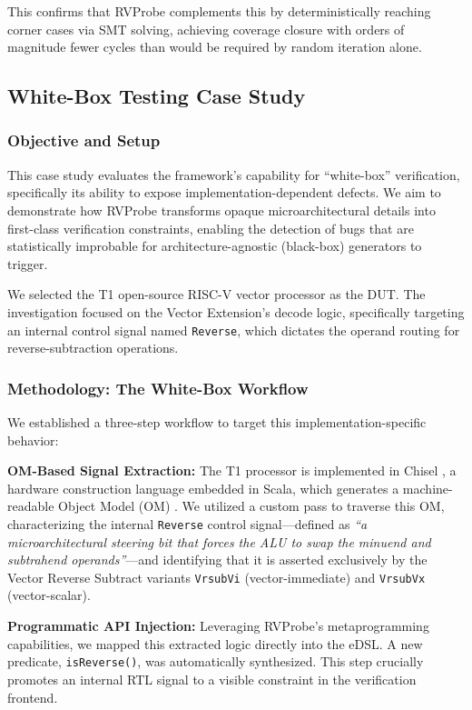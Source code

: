 \documentclass[sigconf]{acmart}
\begin{document}
This confirms that RVProbe complements this by deterministically reaching corner cases via SMT solving, achieving coverage closure with orders of magnitude fewer cycles than would be required by random iteration alone.

\subsection{White-Box Testing Case Study}

\subsubsection{Objective and Setup} This case study evaluates the framework's capability for ``white-box'' verification, specifically its ability to expose implementation-dependent defects. We aim to demonstrate how RVProbe transforms opaque microarchitectural details into first-class verification constraints, enabling the detection of bugs that are statistically improbable for architecture-agnostic (black-box) generators to trigger.

We selected the T1 open-source RISC-V vector processor \cite{22} as the DUT. The investigation focused on the Vector Extension's decode logic, specifically targeting an internal control signal named \texttt{Reverse}, which dictates the operand routing for reverse-subtraction operations.

\subsubsection{Methodology: The White-Box Workflow} 

We established a three-step workflow to target this implementation-specific behavior:

\textbf{OM-Based Signal Extraction:} The T1 processor is implemented in Chisel \cite{25}, a hardware construction language embedded in Scala, which generates a machine-readable Object Model (OM) \cite{24}. We utilized a custom pass to traverse this OM, characterizing the internal \texttt{Reverse} control signal—defined as \textit{``a microarchitectural steering bit that forces the ALU to swap the minuend and subtrahend operands''}—and identifying that it is asserted exclusively by the Vector Reverse Subtract variants \texttt{VrsubVi} (vector-immediate) and \texttt{VrsubVx} (vector-scalar).

\textbf{Programmatic API Injection:} Leveraging RVProbe's metaprogramming capabilities, we mapped this extracted logic directly into the eDSL. A new predicate, \texttt{isReverse()}, was automatically synthesized. This step crucially promotes an internal RTL signal to a visible constraint in the verification frontend. 
\end{document}
